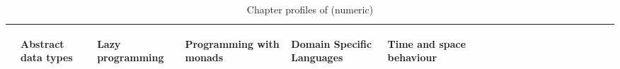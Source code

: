 \begin{table*}[h!]
\begin{minipage}[b]{0.5\linewidth}
{\begin{tabular}{llllllllllllllllllll}
& \begin{sideways} Abstract data types \end{sideways} & \begin{sideways} Lazy programming \end{sideways} & \begin{sideways} Programming with monads \end{sideways} & \begin{sideways} Domain Specific Languages \end{sideways} & \begin{sideways} Time and space behaviour \end{sideways} \\ 
  \hline
  
   \hline
\end{tabular}}
\caption{Chapter profiles of \craftTag (numeric)}
\label{T:chapterProfilesCraftNumeric}
\end{minipage}
\end{table*}


